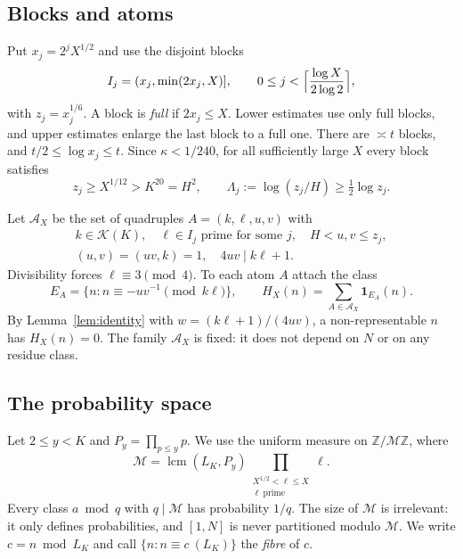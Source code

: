 \documentclass[10pt,reqno]{amsart}
\theoremstyle{remark}
\newcommand{\K}{\mathcal K}
\newcommand{\A}{\mathcal A}
\newcommand{\ind}{\mathbf1}
\newcommand{\lcm}{\operatorname{lcm}}
\begin{document}
\subsection*{Blocks and atoms}
Put $x_j=2^jX^{1/2}$ and use the disjoint blocks
\[
 I_j=(x_j,\min(2x_j,X)],\qquad
 0\leq j<\Bigl\lceil\frac{\log X}{2\log2}\Bigr\rceil,
\]
with $z_j=x_j^{1/6}$.  A block is \emph{full} if $2x_j\leq X$.  Lower
estimates use only full blocks, and upper estimates enlarge the last block
to a full one.  There are $\asymp t$ blocks, and $t/2\leq\log x_j\leq t$.
Since $\kappa<1/240$, for all sufficiently large $X$ every block satisfies
\begin{equation}\label{eq:floor}
 z_j\geq X^{1/12}>K^{20}=H^2,
 \qquad \Lambda_j:=\log(z_j/H)\geq\tfrac12\log z_j.
\end{equation}

Let $\A_X$ be the set of quadruples $A=(k,\ell,u,v)$ with
\begin{equation}\label{eq:atomdef}
 \begin{gathered}
 k\in\K(K),\quad \ell\in I_j\text{ prime for some }j,\quad H<u,v\leq z_j,\\
 (u,v)=(uv,k)=1,\quad 4uv\mid k\ell+1.
 \end{gathered}
\end{equation}
Divisibility forces $\ell\equiv3\pmod4$.  To each atom $A$ attach the class
\begin{equation}\label{eq:cylinder}
 E_A=\{n:n\equiv-uv^{-1}\pmod{k\ell}\},\qquad
 H_X(n)=\sum_{A\in\A_X}\ind_{E_A}(n).
\end{equation}
By Lemma~\ref{lem:identity} with $w=(k\ell+1)/(4uv)$, a non-representable
$n$ has $H_X(n)=0$.  The family $\A_X$ is fixed: it does not depend on $N$
or on any residue class.

\subsection*{The probability space}
Let $2\leq y<K$ and $P_y=\prod_{p\leq y}p$.  We use the uniform measure on
$\mathbb Z/\mathcal M\mathbb Z$, where
\begin{equation}\label{eq:space}
 \mathcal M=\lcm(L_K,P_y)\prod_{\substack{X^{1/2}<\ell\leq X\\\ell\
 \mathrm{prime}}}\ell .
\end{equation}
Every class $a\bmod q$ with $q\mid\mathcal M$ has probability $1/q$.  The
size of $\mathcal M$ is irrelevant: it only defines probabilities, and
$[1,N]$ is never partitioned modulo $\mathcal M$.  We write
$c=n\bmod L_K$ and call $\{n:n\equiv c\ (L_K)\}$ the \emph{fibre} of $c$.
\end{document}
